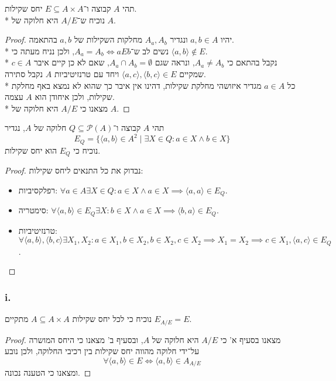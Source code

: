 \Question{}
\Subquestion{}
תהי $A$ קבוצה ו־$E \subseteq A \times A$ יחס שקילות. \\*
נוכיח ש־$A / E$ היא חלוקה של $A$.
\begin{proof}
	יהיו $a, b \in A$ ונגדיר $A_a, A_b$ מחלקות השקילות של $a, b$ בהתאמה. \\*
	נשים לב ש־$A_a = A_b \iff aEb$, ולכן נניח מעתה כי $\langle a, b \rangle \not\in E$. \\*
	נקבל בהתאם כי $A_a \ne A_b$, ונראה שגם $A_a \cap A_b = \emptyset$, שאם לא כן קיים איבר $c \in A$ שמקיים $\langle a, c \rangle, \langle b, c \rangle \in E$ ויחד עם טרנזיטיביות $A$ נקבל סתירה. \\*
	כל $a \in A$ מגדיר איזושהי מחלקת שקילות, דהינו אין איבר כך שהוא לא נמצא באף מחלקת שקילות, ולכן איחודן הוא $A$ עצמה. \\*
	מצאנו כי $A/E$ היא חלוקה של $A$.
\end{proof}

\Subquestion{}
תהי $A$ קבוצה ו־$Q \subseteq \mathcal{P}(A)$ חלוקה של $A$, נגדיר
\[
	E_Q = \{ \langle a, b \rangle \in A^2 \mid \exists X \in Q : a \in X \land b \in X \}
\]
נוכיח כי $E_Q$ הוא יחס שקילות.
\begin{proof}
	נבדוק את כל התנאים ליחס שקילות:
	\begin{itemize}
		\item רפלקסיביות: $\forall a \in A \exists X \in Q : a \in X \land a \in X \implies \langle a, a \rangle \in E_Q$.
		\item סימטריה: $\forall \langle a, b \rangle \in E_Q \exists X : b \in X \land a \in X \implies \langle b, a \rangle \in E_Q$.
		\item טרנזיטיביות: $\forall \langle a, b \rangle, \langle b, c \rangle \exists X_1, X_2 : a \in X_1, b \in X_2, b \in X_2, c \in X_2 \implies X_1 = X_2 \implies c \in X_1, \langle a, c \rangle \in E_Q$.
	\end{itemize}
\end{proof}

\Subquestion{}
\subsubsection{i.}
נוכיח כי לכל יחס שקילות $A \subseteq A \times A$ מתקיים $E_{A/E} = E$.
\begin{proof}
	מצאנו בסעיף א' כי $A/E$ היא חלוקה של $A$, ובסעיף ב' מצאנו כי היחס המושרה על־ידי חלוקה מהווה יחס שקילות בין רכיבי החלוקה, ולכן נובע
	\[
		\forall \langle a, b \rangle \in E \iff \langle a, b \rangle \in A_{A/E}
	\]
	ומצאנו כי הטענה נכונה.
\end{proof}

